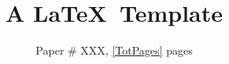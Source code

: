\documentclass[sigconf, 10pt]{acmart}
\begin{document}
\title{A \LaTeX\ Template}


\author{Paper \# XXX, \ref{TotPages} pages}

\renewcommand{\shortauthors}{X.et al.}


\begin{abstract}

\end{abstract}

\maketitle



% 


\end{document}
